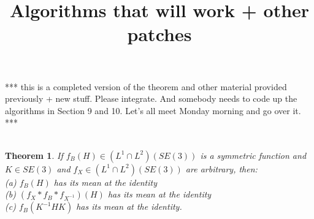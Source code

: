 \documentclass[twocolumn,10pt]{asme2ej}
\title{Algorithms that will work + other patches}
\newtheorem{theorem}{Theorem}[section]
\begin{document}
\maketitle

\section{} \section{}
\section{} \section{}
\section{} \section{}
*** this is a completed version of the theorem and other material provided previously + new stuff. Please integrate. And somebody needs to
code up the algorithms in Section 9 and 10. Let's all meet Monday morning and go over it. *** \\ \\ 

\begin{theorem}
If $f_B(H) \in (L^1 \cap L^2)(SE(3))$ is a symmetric function and $K \in SE(3)$ and $f_X \in (L^1 \cap L^2)(SE(3))$ are arbitrary, then: \\
(a) $f_B(H)$ has its mean at the identity \\
(b)  $(f_X * f_B* f_{X^{-1}})(H)$ has its mean at the identity \\
(c) $f_B(K^{-1} H K)$ has its mean at the identity.
\end{theorem}
\end{document}
